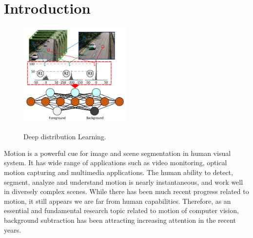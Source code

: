 \documentclass[UTF8]{article}
\begin{document}





\section*{Introduction}
\begin{figure}
  \includegraphics[width=0.5\textwidth]{figure/fig1.pdf}\\
    \label{fig1}
  \caption{Deep distribution Learning.}
    \label{fig1}
\end{figure}


Motion is a powerful cue for image and scene segmentation in human visual system.
%
It has wide range of applications such as video monitoring, optical motion capturing and multimedia applications.
%
The human ability to detect, segment, analyze and understand motion is nearly instantaneous,
and work well in diversely complex scenes.
%
While there has been much recent progress related to motion, it still appears we are far from human capabilities.
%
Therefore,
as an essential and fundamental research topic related to motion of computer vision,
background subtraction has been attracting increasing attention in the recent years.
\end{document}
